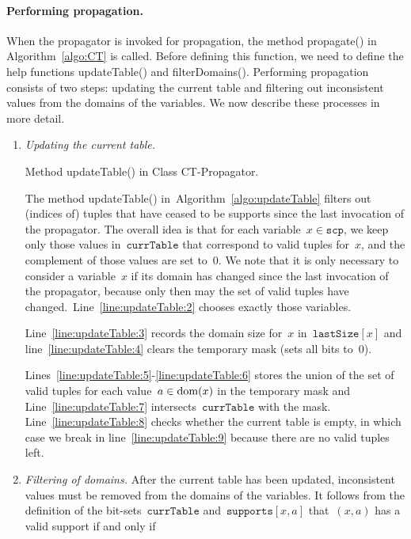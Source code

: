 \documentclass[a4paper,11pt]{article}
\newcommand{\Algoref}[1]{Algorithm~\ref{#1}}
\newcommand{\Lineref}[1]{Line~\ref{#1}}
\newcommand{\Linesref}[2]{Lines~\ref{#1}-\ref{#2}}
\newcommand{\Scp}{\texttt{scp}}
\newcommand{\CurrTable}{\texttt{currTable}}
\newcommand{\LastSizes}{\texttt{lastSize}}
\newcommand{\Supports}{\texttt{supports}}
\numberwithin{equation}{section}
\begin{document}
\paragraph{Performing propagation.}
When the propagator is invoked for propagation, the method propagate()
in \Algoref{algo:CT} is called. Before defining this function, we need
to define the help functions updateTable() and filterDomains().
Performing propagation consists of two steps: updating the current
table and filtering out inconsistent values from the domains of the variables.
We now describe these processes in more detail.

\begin{enumerate}
\item \textit{Updating the current table.} 
  
  \begin{algorithm}[H]
  \begin{algorithmic}[1]  %
    
  \end{algorithmic}
  \caption{Method updateTable() in Class CT-Propagator.}
  \label{algo:updateTable}
\end{algorithm}

  The method updateTable() in~\Algoref{algo:updateTable}
  filters out (indices of)
  tuples that have ceased to be supports since the last invocation of the
  propagator. The overall idea is that for each variable~$x \in \Scp$, we keep 
  only those values in~$\CurrTable$ that correspond to valid tuples for~$x$, and the
  complement of those values are set to~$0$. We note that
  it is only necessary to consider a variable~$x$ if its domain has changed
  since the last invocation of the propagator, because only then
  may the set of valid tuples have changed.~\Lineref{line:updateTable:2}
  chooses exactly those variables.

  \Lineref{line:updateTable:3} records the domain size for~$x$ in~$\LastSizes[x]$
  and line~\ref{line:updateTable:4} clears the temporary mask (sets all bits to~$0$).

  \Linesref{line:updateTable:5}{line:updateTable:6} stores the union of the
  set of valid tuples for each value~$a \in \text{dom}(x)$ in the temporary mask
  and \Lineref{line:updateTable:7} intersects~$\CurrTable$ with the mask.
  \Lineref{line:updateTable:8} checks whether the current table is empty,
  in which case we break in line~\ref{line:updateTable:9}
  because there are no valid tuples left.

\item 
  \textit{Filtering of domains.}
  After the current table has been updated, inconsistent values must be removed
  from the domains of the variables.   
  It follows from the definition of the bit-sets~$\CurrTable$ and~$\Supports[x,a]$
  that~$(x,a)$ has a valid support if and only if 


\end{enumerate}
\end{document}
